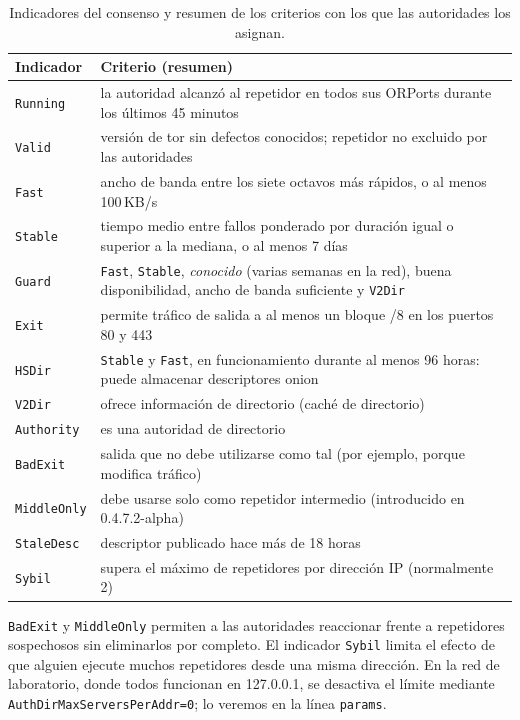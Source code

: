 \begin{table}[htbp]
\centering\small
\begin{tabularx}{\textwidth}{@{}l>{\raggedright\arraybackslash}X@{}}
\toprule
Indicador & Criterio (resumen) \\
\midrule
\texttt{Running} & la autoridad alcanzó al repetidor en todos sus ORPorts durante los últimos 45 minutos \\
\texttt{Valid} & versión de tor sin defectos conocidos; repetidor no excluido por las autoridades \\
\texttt{Fast} & ancho de banda entre los siete octavos más rápidos, o al menos 100\,KB/s \\
\texttt{Stable} & tiempo medio entre fallos ponderado por duración igual o superior a la mediana, o al menos 7 días \\
\texttt{Guard} & \texttt{Fast}, \texttt{Stable}, \emph{conocido} (varias semanas en la red), buena disponibilidad, ancho de banda suficiente y \texttt{V2Dir} \\
\texttt{Exit} & permite tráfico de salida a al menos un bloque /8 en los puertos 80 y 443 \\
\texttt{HSDir} & \texttt{Stable} y \texttt{Fast}, en funcionamiento durante al menos 96 horas: puede almacenar descriptores onion \\
\texttt{V2Dir} & ofrece información de directorio (caché de directorio) \\
\texttt{Authority} & es una autoridad de directorio \\
\texttt{BadExit} & salida que no debe utilizarse como tal (por ejemplo, porque modifica tráfico) \\
\texttt{MiddleOnly} & debe usarse solo como repetidor intermedio (introducido en 0.4.7.2-alpha) \\
\texttt{StaleDesc} & descriptor publicado hace más de 18 horas \\
\texttt{Sybil} & supera el máximo de repetidores por dirección IP (normalmente 2) \\
\bottomrule
\end{tabularx}
\caption{Indicadores del consenso y resumen de los criterios con los que las autoridades los asignan.}
\label{tab:flag}
\end{table}

\texttt{BadExit} y \texttt{MiddleOnly} permiten a las autoridades reaccionar frente a repetidores sospechosos sin eliminarlos por completo. El indicador \texttt{Sybil} limita el efecto de que alguien ejecute muchos repetidores desde una misma dirección. En la red de laboratorio, donde todos funcionan en 127.0.0.1, se desactiva el límite mediante \texttt{AuthDirMaxServersPerAddr=0}; lo veremos en la línea \texttt{params}.

